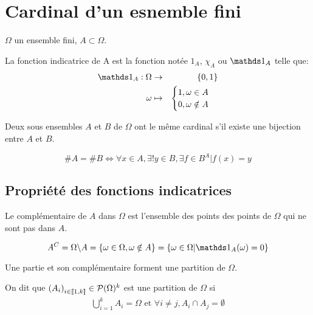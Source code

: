 \section{Cardinal d'un esnemble fini}
$\Omega$ un ensemble fini, $A\subset\Omega$.
\begin{definition}
  La fonction indicatrice de A est la fonction notée $1_A$, $\chi_A$ ou
  $\indic_A$ telle que:
  \begin{eqnarray*}
    \indic_A : \Omega &\rightarrow& \{0, 1\}\\
          \omega &\mapsto& \begin{cases}
                          1, \omega\in A\\
                          0, \omega\notin A
                        \end{cases}
  \end{eqnarray*}
\end{definition}

\begin{proposition}
  Deux sous ensembles $A$ et $B$ de $\Omega$ ont le même cardinal s'il existe
  une bijection entre $A$ et $B$.

  \[
    \# A = \# B \iff \forall x \in A,
    \exists ! y \in B, \exists f\in B^A | f(x)=y
  \]

\end{proposition}

\subsection{Propriété des fonctions indicatrices}
\label{sub:Propriété des fonctions indicatrices}
  \begin{definition}
    Le complémentaire de $A$ dans $\Omega$ est l'ensemble des points des
    points de $\Omega$ qui ne sont pas dans $A$.

    \[A^C = \Omega\backslash A = \rdbrackets{\omega\in\Omega, \omega\notin A}
                               = \rdbrackets{\omega\in\Omega|\indic_A(\omega)=0}
    \]

  \end{definition}

  Une partie et son complémentaire forment une partition de $\Omega$.

  \begin{definition}
  \label{partition}
    On dit que $\left(A_i\right)_{i\in\left\llbracket1,k\right\rrbracket}\in\mathcal{P}(\Omega)^k$
    est une partition de $\Omega$ si
    \begin{eqnarray*}
      \bigcup_{i=1}^k A_i = \Omega \text{ et }
      \forall i\neq j, A_i\cap A_j = \emptyset
    \end{eqnarray*}
  \end{definition}

